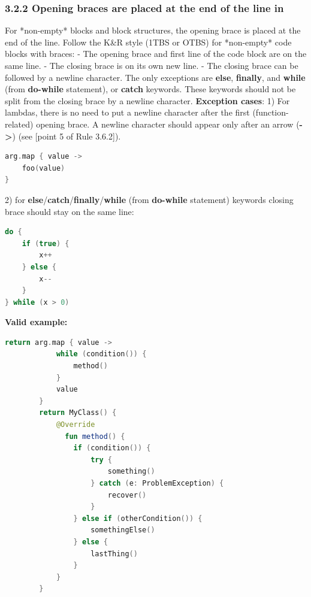 \subsubsection*{\textbf{3.2.2  Opening braces are placed at the end of the line in}}
\leavevmode\newline
\label{sec:3.2.2}
For *non-empty* blocks and block structures, the opening brace is placed at the end of the line.
Follow the K\&R style (1TBS or OTBS) for *non-empty* code blocks with braces:
- The opening brace and first line of the code block are on the same line.
- The closing brace is on its own new line.
- The closing brace can be followed by a newline character. The only exceptions are \textbf{else}, \textbf{finally}, and \textbf{while} (from \textbf{do-while} statement), or \textbf{catch} keywords.
These keywords should not be split from the closing brace by a newline character.
\textbf{Exception cases}: 
1) For lambdas, there is no need to put a newline character after the first (function-related) opening brace. A newline character should appear only after an arrow (\textbf{->}) (see [point 5 of Rule 3.6.2]).
\begin{lstlisting}[language=Kotlin]
arg.map { value ->
    foo(value)
}
\end{lstlisting}
2) for \textbf{else}/\textbf{catch}/\textbf{finally}/\textbf{while} (from \textbf{do-while} statement) keywords closing brace should stay on the same line:
\begin{lstlisting}[language=Kotlin]
do {
    if (true) {
        x++
    } else {
        x--
    }
} while (x > 0) 
\end{lstlisting}
 
\textbf{Valid example:}
\begin{lstlisting}[language=Kotlin]
        return arg.map { value ->
            while (condition()) {
                method()
            }
            value 
        }
        return MyClass() {
            @Override
              fun method() {
                if (condition()) {
                    try {
                        something()
                    } catch (e: ProblemException) {
                        recover()
                    }
                } else if (otherCondition()) {
                    somethingElse()
                } else {
                    lastThing()
                }
            }
        }
\end{lstlisting}
